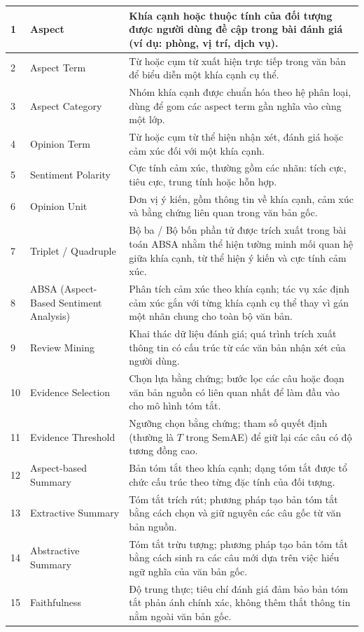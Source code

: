 \documentclass[12pt,a4paper]{report}
\begin{document}
\begin{longtable}{|p{}|p{}|p{}|}
1 & Aspect & Khía cạnh hoặc thuộc tính của đối tượng được người dùng đề cập trong bài đánh giá (ví dụ: phòng, vị trí, dịch vụ). \\ \hline
2 & Aspect Term & Từ hoặc cụm từ xuất hiện trực tiếp trong văn bản để biểu diễn một khía cạnh cụ thể. \\ \hline
3 & Aspect Category & Nhóm khía cạnh được chuẩn hóa theo hệ phân loại, dùng để gom các aspect term gần nghĩa vào cùng một lớp. \\ \hline
4 & Opinion Term & Từ hoặc cụm từ thể hiện nhận xét, đánh giá hoặc cảm xúc đối với một khía cạnh. \\ \hline
5 & Sentiment Polarity & Cực tính cảm xúc, thường gồm các nhãn: tích cực, tiêu cực, trung tính hoặc hỗn hợp. \\ \hline
6 & Opinion Unit & Đơn vị ý kiến, gồm thông tin về khía cạnh, cảm xúc và bằng chứng liên quan trong văn bản gốc. \\ \hline
7 & Triplet / Quadruple & Bộ ba / Bộ bốn phần tử được trích xuất trong bài toán ABSA nhằm thể hiện tường minh mối quan hệ giữa khía cạnh, từ thể hiện ý kiến và cực tính cảm xúc. \\ \hline
8 & ABSA (Aspect-Based Sentiment Analysis) & Phân tích cảm xúc theo khía cạnh; tác vụ xác định cảm xúc gắn với từng khía cạnh cụ thể thay vì gán một nhãn chung cho toàn bộ văn bản. \\ \hline
9 & Review Mining & Khai thác dữ liệu đánh giá; quá trình trích xuất thông tin có cấu trúc từ các văn bản nhận xét của người dùng. \\ \hline
10 & Evidence Selection & Chọn lựa bằng chứng; bước lọc các câu hoặc đoạn văn bản nguồn có liên quan nhất để làm đầu vào cho mô hình tóm tắt. \\ \hline
11 & Evidence Threshold & Ngưỡng chọn bằng chứng; tham số quyết định (thường là $T$ trong SemAE) để giữ lại các câu có độ tương đồng cao. \\ \hline
12 & Aspect-based Summary & Bản tóm tắt theo khía cạnh; dạng tóm tắt được tổ chức cấu trúc theo từng đặc tính của đối tượng. \\ \hline
13 & Extractive Summary & Tóm tắt trích rút; phương pháp tạo bản tóm tắt bằng cách chọn và giữ nguyên các câu gốc từ văn bản nguồn. \\ \hline
14 & Abstractive Summary & Tóm tắt trừu tượng; phương pháp tạo bản tóm tắt bằng cách sinh ra các câu mới dựa trên việc hiểu ngữ nghĩa của văn bản gốc. \\ \hline
15 & Faithfulness & Độ trung thực; tiêu chí đánh giá đảm bảo bản tóm tắt phản ánh chính xác, không thêm thắt thông tin nằm ngoài văn bản gốc. \\ \hline

\end{longtable}
\end{document}
